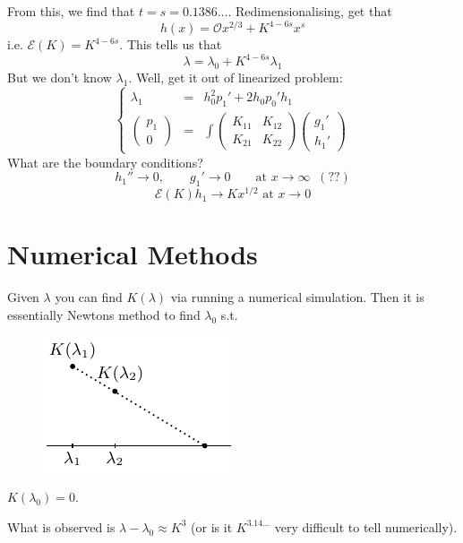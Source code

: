 \documentclass{article}
\newcommand{\cE}{\mathcal{E}}                               %
\begin{document}
From this, we find that $t=s=0.1386\dots$. Redimensionalising, get that
\[ h(x) = \mathcal{O} x^{2/3} + K^{4-6s}x^s\]
i.e. $\cE(K)=K^{4-6s}$. This tells us that 
\[\lambda = \lambda_0 + K^{4-6s}\lambda_1 \]
But we don't know $\lambda_1$.
Well, get it out of linearized problem:
\[ \left\{ \begin{array}{ccc}
\lambda_1 &=& h_0^2p_1'+2h_0p_0'h_1 \\[6pt]
\left(\begin{array}{c} p_1 \\ 0 \end{array} \right)
& =&  \int \left(
\begin{array}{cc} K_{11} & K_{12} \\ K_{21} & K_{22} \end{array}
\right)
 \left( \begin{array}{c} g_1' \\ h_1' \end{array} \right)
 
\end{array}
\right.
\]
What are the boundary conditions?
\[h_1'' \to 0, \qquad g_1' \to 0 \qquad \mbox{at } x \to \infty \;\;(??)\]
\[ \cE(K)h_1 \to Kx^{1/2} \mbox{  at } x\to 0 \]

\section{Numerical Methods}
Given $\lambda$ you can find $K(\lambda)$ via running a numerical simulation.
Then it is essentially Newtons method to find $\lambda_0$ s.t. 
\begin{figure}[!ht]\centering
\includegraphics{Fig4.pdf}
\end{figure}
$K(\lambda_0)=0$.

What is observed is $\lambda - \lambda_0 \approx K^3$ (or is it $K^{3.14\dots}$
very difficult to tell numerically).
\end{document}
